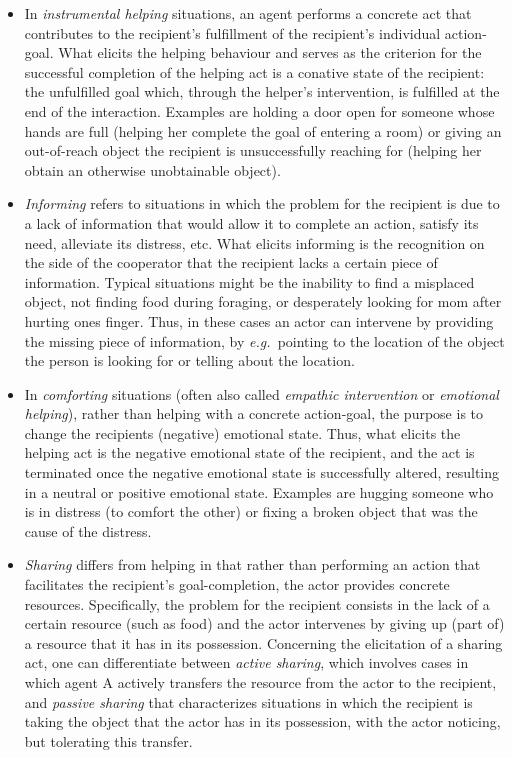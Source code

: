 \documentclass{article}
\newcommand{\eg}{{\textit{e.g.~}}}
\begin{document}
\begin{itemize}

\item In \emph{instrumental helping} situations, an agent performs a concrete
act that contributes to the recipient's fulfillment of the recipient's
individual action-goal. What elicits the helping behaviour and serves as the
criterion for the successful completion of the helping act is a conative state
of the recipient: the unfulfilled goal which, through the helper's
intervention, is fulfilled at the end of the interaction. Examples are holding a
door open for someone whose hands are full (helping her complete the goal of
entering a room) or giving an out-of-reach object the recipient is
unsuccessfully reaching for (helping her obtain an otherwise unobtainable
object).

\item \emph{Informing} refers to situations in which the problem for the
recipient is due to a lack of information that would allow it to complete an
action, satisfy its need, alleviate its distress, etc. What elicits informing
is the recognition on the side of the cooperator that the recipient lacks a
certain piece of information. Typical situations might be the inability to find
a misplaced object, not finding food during foraging, or desperately looking
for mom after hurting ones finger. Thus, in these cases an actor can intervene
by providing the missing piece of information, by \eg pointing to the
location of the object the person is looking for or telling about the
location.

\item In \textit{comforting} situations (often also called \emph{empathic
intervention} or \emph{emotional helping}), rather than helping with a concrete
action-goal, the purpose is to change the recipients (negative) emotional
state. Thus, what elicits the helping act is the negative emotional state of
the recipient, and the act is terminated once the negative emotional state is
successfully altered, resulting in a neutral or positive emotional state.
Examples are hugging someone who is in distress (to comfort the other) or
fixing a broken object that was the cause of the distress.

\item \textit{Sharing} differs from helping in that rather than performing an
action that facilitates the recipient's goal-completion, the actor provides
concrete resources. Specifically, the problem for the recipient consists in the
lack of a certain resource (such as food) and the actor intervenes by giving up
(part of) a resource that it has in its possession. Concerning the
elicitation of a sharing act, one can differentiate between \emph{active
sharing}, which involves cases in which agent A actively transfers the resource
from the actor to the recipient, and \emph{passive sharing} that characterizes
situations in which the recipient is taking the object that the actor has in
its possession, with the actor noticing, but tolerating this transfer. 

\end{itemize}
\end{document}
